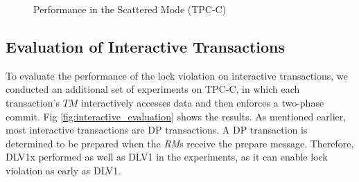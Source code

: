 \documentclass[conference]{IEEEtran}
\begin{document}
\begin{figure}[tbp]
  \centering
      \caption{Performance in the Scattered Mode (TPC-C) }
      \label{fig:new_order_add_terminal_scattered}
\end{figure}



\subsection{Evaluation of Interactive Transactions}

\begin{highlighted}

To evaluate the performance of the lock violation on interactive transactions,
we conducted an additional set of experiments on TPC-C, in which each transaction's ${TM}$ interactively accesses data and then enforces a two-phase commit.
Fig \ref{fig:interactive_evaluation} shows the results.
As mentioned earlier, most interactive transactions are DP transactions.
A DP transaction is determined to be prepared when the \emph{RM}s receive the prepare message.
Therefore, DLV1x performed as well as DLV1 in the experiments, as it can enable lock violation as early as DLV1.
\end{highlighted}
\end{document}
